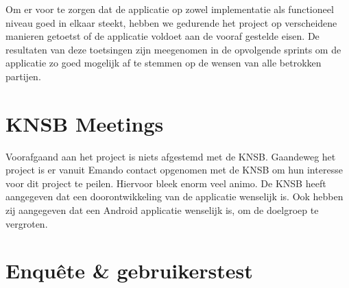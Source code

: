 Om er voor te zorgen dat de applicatie op zowel implementatie als functioneel niveau goed in elkaar steekt, hebben we gedurende het project op verscheidene manieren getoetst of de applicatie voldoet aan de vooraf gestelde eisen. De resultaten van deze toetsingen zijn meegenomen in de opvolgende sprints om de applicatie zo goed mogelijk af te stemmen op de wensen van alle betrokken partijen.

\section{KNSB Meetings}
Voorafgaand aan het project is niets afgestemd met de \ac{KNSB}. Gaandeweg het project is er vanuit Emando contact opgenomen met de \ac{KNSB} om hun interesse voor dit project te peilen. Hiervoor bleek enorm veel animo. De \ac{KNSB} heeft aangegeven dat een doorontwikkeling van de applicatie wenselijk is. Ook hebben zij aangegeven dat een Android applicatie wenselijk is, om de doelgroep te vergroten.

\section{Enquête \& gebruikerstest}


